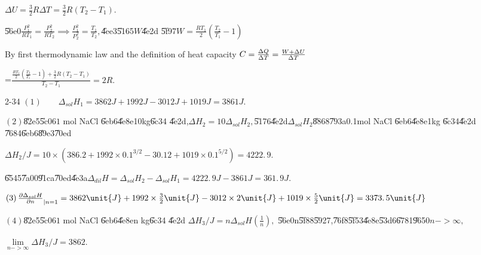 \documentclass{article}
\begin{document}
$\Delta U=\frac{3}{2}R\Delta T=\frac{3}{2}R\left( T_{2}-T_{1}\right) .$

\U{56e0}\qquad $\frac{P_{1}^{2}}{RT_{1}}=\frac{P_{2}^{2}}{RT_{2}}\implies 
\frac{P_{1}^{2}}{P_{2}^{2}}=\frac{T_{1}}{T_{2}},$\U{4ee3}\U{5165}$W$\U{4e2d}%
\U{5f97}\qquad $W=\frac{RT_{1}}{2}\left( \frac{T_{2}}{T_{1}}-1\right) $

By first thermodynamic law and the definition of heat capacity $C=\frac{%
\Delta Q}{\Delta T}=\frac{W+\Delta U}{\Delta T}$

=$\frac{\frac{RT_{1}}{2}\left( \frac{T_{2}}{T_{1}}-1\right) +\frac{3}{2}%
R\left( T_{2}-T_{1}\right) }{T_{2}-T_{1}}=\allowbreak 2R.$

2-34 $\left( 1\right) \qquad \Delta _{sol}H_{1}=3862\unit{J}+1992\unit{J}%
-3012\unit{J}+1019\unit{J}=\allowbreak 3861\unit{J}.$

$\left( 2\right) $\U{82e5}\U{5c06}$1$ mol NaCl \U{6eb6}\U{4e8e}10kg\U{6c34}%
\U{4e2d},$\Delta H_{2}=10\Delta _{sol}H_{2},$\U{5176}\U{4e2d}$\Delta
_{sol}H_{2}$\U{8868}\U{793a}0.1mol NaCl \U{6eb6}\U{4e8e}1kg \U{6c34}\U{4e2d}%
\U{7684}\U{6eb6}\U{89e3}\U{70ed}

$\Delta H_{2}/\unit{J}=10\times \left( 386.2+1992\times
0.1^{3/2}-30.12+1019\times 0.1^{5/2}\right) =\allowbreak 4222.\,\allowbreak
9.$

\U{6545}\U{7a00}\U{91ca}\U{70ed}\U{4e3a}\qquad $\Delta _{dil}H=\Delta
_{sol}H_{2}-\Delta _{sol}H_{1}=\allowbreak \allowbreak 4222.\,\allowbreak 9%
\unit{J}-\allowbreak 3861\unit{J}=\allowbreak 361.\,\allowbreak 9\unit{J}.$

$\left( 3\right) \frac{\partial \Delta _{sol}H}{\partial n}_{|n=1}=3862\unit{%
J}+1992\times \frac{3}{2}\unit{J}-3012\times 2\unit{J}+1019\times \frac{5}{2}%
\unit{J}=\allowbreak 3373.\,\allowbreak 5\unit{J}$

$\left( 4\right) $\U{82e5}\U{5c06}$1$ mol NaCl \U{6eb6}\U{4e8e}n kg\U{6c34}%
\U{4e2d} $\Delta H_{3}/\unit{J}=n\Delta _{sol}H\left( \frac{1}{n}\right) ,$%
\U{56e0}n\U{5f88}\U{5927},\U{76f8}\U{5f53}\U{4e8e}\U{53d6}\U{6781}\U{9650}$%
n->\infty ,$

$\underset{n->\infty }{\lim }\Delta H_{3}/\unit{J}=3862.$
\end{document}
